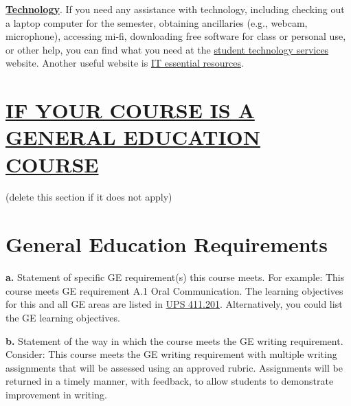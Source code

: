 \documentclass[12pt]{article}
\begin{document}
\vspace{0.5em}

\noindent \textbf{\underline{Technology}}. {\color{suggestionred}If you need any assistance with technology, including checking out a laptop computer for the semester, obtaining ancillaries (e.g., webcam, microphone), accessing mi-fi, downloading free software for class or personal use, or other help, you can find what you need at the \href{https://www.fullerton.edu/IT/students/}{student technology services} website. Another useful website is \href{http://www.fullerton.edu/it/essential-resources/}{IT essential resources}.}

\section*{\underline{IF YOUR COURSE IS A GENERAL EDUCATION COURSE}} {\color{annotationblue}(delete this section if it does not apply)}

\section*{General Education Requirements}


\vspace{0.5em}

\noindent \textbf{a.} {\color{annotationblue}Statement of specific GE requirement(s) this course meets.} {\color{suggestionred}For example: This course meets GE requirement A.1 Oral Communication. The learning objectives for this and all GE areas are listed in \href{https://www.fullerton.edu/senate/publications_policies_resolutions/ups/UPS\%20400/UPS\%20411.201.pdf}{UPS 411.201}. Alternatively, you could list the GE learning objectives.}

\vspace{0.5em}

\noindent \textbf{b.} {\color{annotationblue}Statement of the way in which the course meets the GE writing requirement.} {\color{suggestionred}Consider: This course meets the GE writing requirement with multiple writing assignments that will be assessed using an approved rubric. Assignments will be returned in a timely manner, with feedback, to allow students to demonstrate improvement in writing.}
\end{document}
